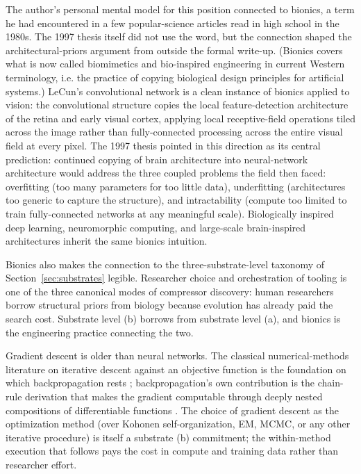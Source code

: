 \documentclass[11pt]{article}
\begin{document}
The author's personal mental model for this position connected to bionics, a term he had encountered in a few popular-science articles read in high school in the 1980s. The 1997 thesis itself did not use the word, but the connection shaped the architectural-priors argument from outside the formal write-up. (Bionics covers what is now called biomimetics and bio-inspired engineering in current Western terminology, i.e. the practice of copying biological design principles for artificial systems.) LeCun's convolutional network is a clean instance of bionics applied to vision: the convolutional structure copies the local feature-detection architecture of the retina and early visual cortex, applying local receptive-field operations tiled across the image rather than fully-connected processing across the entire visual field at every pixel. The 1997 thesis pointed in this direction as its central prediction: continued copying of brain architecture into neural-network architecture would address the three coupled problems the field then faced: overfitting (too many parameters for too little data), underfitting (architectures too generic to capture the structure), and intractability (compute too limited to train fully-connected networks at any meaningful scale). Biologically inspired deep learning, neuromorphic computing, and large-scale brain-inspired architectures inherit the same bionics intuition.

Bionics also makes the connection to the three-substrate-level taxonomy of Section~\ref{sec:substrates} legible. Researcher choice and orchestration of tooling is one of the three canonical modes of compressor discovery: human researchers borrow structural priors from biology because evolution has already paid the search cost. Substrate level (b) borrows from substrate level (a), and bionics is the engineering practice connecting the two.

Gradient descent is older than neural networks. The classical numerical-methods literature on iterative descent against an objective function is the foundation on which backpropagation rests \citep{mudrov1991}; backpropagation's own contribution is the chain-rule derivation that makes the gradient computable through deeply nested compositions of differentiable functions \citep{rumelhart1986}. The choice of gradient descent as the optimization method (over Kohonen self-organization, EM, MCMC, or any other iterative procedure) is itself a substrate (b) commitment; the within-method execution that follows pays the cost in compute and training data rather than researcher effort.
\end{document}
